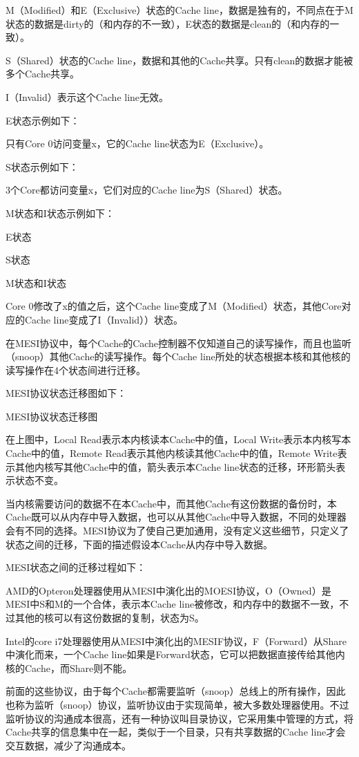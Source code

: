 \documentclass[12pt,UTF8]{ctexbook}
\begin{document}
M（Modified）和E（Exclusive）状态的Cache line，数据是独有的，不同点在于M状态的数据是dirty的（和内存的不一致），E状态的数据是clean的（和内存的一致）。

S（Shared）状态的Cache line，数据和其他的Cache共享。只有clean的数据才能被多个Cache共享。

I（Invalid）表示这个Cache line无效。

E状态示例如下：

只有Core 0访问变量x，它的Cache line状态为E（Exclusive）。

S状态示例如下：

3个Core都访问变量x，它们对应的Cache line为S（Shared）状态。

M状态和I状态示例如下：

E状态

S状态

M状态和I状态

Core 0修改了x的值之后，这个Cache line变成了M（Modified）状态，其他Core对应的Cache line变成了I（Invalid））状态。

在MESI协议中，每个Cache的Cache控制器不仅知道自己的读写操作，而且也监听（snoop）其他Cache的读写操作。每个Cache line所处的状态根据本核和其他核的读写操作在4个状态间进行迁移。

MESI协议状态迁移图如下：

MESI协议状态迁移图

在上图中，Local Read表示本内核读本Cache中的值，Local Write表示本内核写本Cache中的值，Remote Read表示其他内核读其他Cache中的值，Remote Write表示其他内核写其他Cache中的值，箭头表示本Cache line状态的迁移，环形箭头表示状态不变。

当内核需要访问的数据不在本Cache中，而其他Cache有这份数据的备份时，本Cache既可以从内存中导入数据，也可以从其他Cache中导入数据，不同的处理器会有不同的选择。MESI协议为了使自己更加通用，没有定义这些细节，只定义了状态之间的迁移，下面的描述假设本Cache从内存中导入数据。

MESI状态之间的迁移过程如下：

AMD的Opteron处理器使用从MESI中演化出的MOESI协议，O（Owned）是MESI中S和M的一个合体，表示本Cache line被修改，和内存中的数据不一致，不过其他的核可以有这份数据的复制，状态为S。

Intel的core i7处理器使用从MESI中演化出的MESIF协议，F（Forward）从Share中演化而来，一个Cache line如果是Forward状态，它可以把数据直接传给其他内核的Cache，而Share则不能。

前面的这些协议，由于每个Cache都需要监听（snoop）总线上的所有操作，因此也称为监听（snoop）协议，监听协议由于实现简单，被大多数处理器使用。不过监听协议的沟通成本很高，还有一种协议叫目录协议，它采用集中管理的方式，将Cache共享的信息集中在一起，类似于一个目录，只有共享数据的Cache line才会交互数据，减少了沟通成本。
\end{document}
